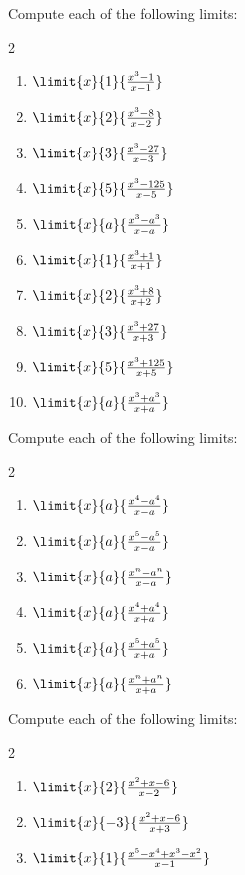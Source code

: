     \begin{embeddedproblem}{}
      Compute each of the following limits:
      \begin{multicols}{2}
        \begin{enumerate}[label={\bf{}(\alph*)}]
        \item $\limit{x}{1}{\frac{x^3-1}{x-1}}$
        \item $\limit{x}{2}{\frac{x^3-8}{x-2}}$
        \item $\limit{x}{3}{\frac{x^3-27}{x-3}}$
        \item $\limit{x}{5}{\frac{x^3-125}{x-5}}$
        \item $\limit{x}{a}{\frac{x^3-a^3}{x-a}}$
        \item $\limit{x}{1}{\frac{x^3+1}{x+1}}$
        \item $\limit{x}{2}{\frac{x^3+8}{x+2}}$
        \item $\limit{x}{3}{\frac{x^3+27}{x+3}}$
        \item $\limit{x}{5}{\frac{x^3+125}{x+5}}$
        \item $\limit{x}{a}{\frac{x^3+a^3}{x+a}}$
        \end{enumerate}
      \end{multicols}
    \end{embeddedproblem}
    
    \begin{embeddedproblem}{}
      Compute each of the following limits:
      \begin{multicols}{2}
        \begin{enumerate}[label={\bf{}(\alph*)}]
        \item $\limit{x}{a}{\frac{x^4-a^4}{x-a}}$
        \item $\limit{x}{a}{\frac{x^5-a^5}{x-a}}$
        \item $\limit{x}{a}{\frac{x^n-a^n}{x-a}}$
        \item $\limit{x}{a}{\frac{x^4+a^4}{x+a}}$
        \item $\limit{x}{a}{\frac{x^5+a^5}{x+a}}$
        \item $\limit{x}{a}{\frac{x^n+a^n}{x+a}}$
        \end{enumerate}
      \end{multicols}
    \end{embeddedproblem}
    
    \begin{embeddedproblem}{}
      Compute each of the following limits:
      \begin{multicols}{2}
        \begin{enumerate}[label={\bf{}(\alph*)}]
        \item $\limit{x}{2}{\frac{x^2+x-6}{x-2}}$
        \item $\limit{x}{-3}{\frac{x^2+x-6}{x+3}}$
        \item $\limit{x}{1}{\frac{x^5-x^4+x^3-x^2}{x-1}}$
        \end{enumerate}
      \end{multicols}
    \end{embeddedproblem}
    
